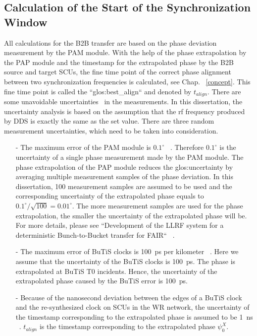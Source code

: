 \subsection{Calculation of the Start of the Synchronization Window}
All calculations for the B2B transfer are based on the phase deviation measurement by the PAM module. With the help of the phase extrapolation by the PAP module and the timestamp for the extrapolated phase by the B2B source and target SCUs, the fine time point of the correct phase alignment between two synchronization frequencies is calculated, see Chap. ~\ref{concept}. This fine time point is called the ``\gls{glos:best_align}`` and denoted by $t_\mathit{align}$. There are some unavoidable uncertainties~\cite{taylor_introduction_1982} in the measurements. In this dissertation, the uncertainty analysis is based on the assumption that the rf frequency produced by DDS is exactly the same as the set value. There are three random measurement uncertainties, which need to be taken into consideration.  
\begin{itemize}
\item[-]The maximum error of the PAM module is $0.1^\circ$ ~\cite{klingbeil_detailed_2013}. Therefore $0.1^\circ$ is the uncertainty of a single phase measurement made by the PAM module. The phase extrapolation of the PAP module reduces the \gls{glos:uncertainty} by averaging multiple measurement samples of the phase deviation. In this dissertation, 100 measurement samples are assumed to be used and the corresponding uncertainty of the extrapolated phase equals to $0.1^\circ/\sqrt{100} =0.01^\circ$. The more measurement samples are used for the phase extrapolation, the smaller the uncertainty of the extrapolated phase will be. For more details, please see ``Development of the LLRF system for a deterministic Bunch-to-Bucket transfer for FAIR`` ~\cite{ferrand_development_nodate}.
\item[-]The maximum error of BuTiS clocks is \SI{100}{\ps} per kilometer ~\cite{moritz_f-cs-rf-14e_2012}. Here we assume that the uncertainty of the BuTiS clocks is \SI{100}{\ps}. The phase is extrapolated at BuTiS T0 incidents. Hence, the uncertainty of the extrapolated phase caused by the BuTiS error is \SI{100}{\ps}. 
\item[-]Because of the nanosecond deviation between the edges of a BuTiS clock and the re-synthesized clock on SCUs in the WR network, the uncertainty of the timestamp corresponding to the extrapolated phase is assumed to be \SI{1}{ns} ~\cite{kreider_receiver_2014}. $t_\mathit{align}$ is the timestamp corresponding to the extrapolated phase $\psi^\mathit{X}_0$.
\end{itemize}
 
